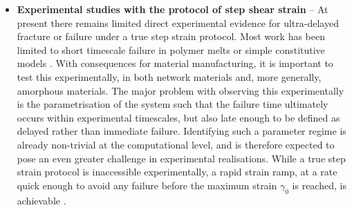 \begin{itemize}
    \item {\bf Experimental studies with the protocol of step shear strain} -- At present there remains limited direct experimental evidence for ultra-delayed fracture or failure under a true step strain protocol. Most work has been limited to short timescale failure in polymer melts \cite{boukany_step_2009,barroso_evaluation_2002,einaga_stress_1973} or simple constitutive models \cite{moorcroft_shear_2014,moorcroft_criteria_2013,adams_nonmonotonic_2009}. With consequences for material manufacturing, it is important to test this experimentally, in both network materials and, more generally, amorphous materials. The major problem with observing this experimentally is the parametrisation of the system such that the failure time ultimately occurs within experimental timescales, but also late enough to be defined as delayed rather than immediate failure. Identifying such a parameter regime is already non-trivial at the computational level, and is therefore expected to pose an even greater challenge in experimental realisations. While a true step strain protocol is inaccessible experimentally, a rapid strain ramp, at a rate quick enough to avoid any failure before the maximum strain $\gamma_0$ is reached, is achievable \cite{barroso_evaluation_2002}. 
\end{itemize}

